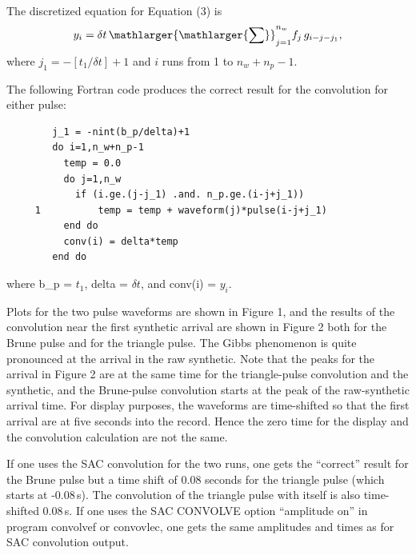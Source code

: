 The discretized equation for Equation (3) is 
\begin{equation}
y_i = \delta t \, \mathlarger{\mathlarger{\sum}}_{j=1}^{n_w}f_{j}\,g_{i-j-j_1}, 
\end{equation}
where $j_1 = -[t_1/\delta t]+1$ and $i$ runs from 1 to $n_w + n_p - 1$.


The following Fortran code produces the correct result for the convolution for either pulse:

\begin{verbatim}
        j_1 = -nint(b_p/delta)+1
        do i=1,n_w+n_p-1
          temp = 0.0
          do j=1,n_w
            if (i.ge.(j-j_1) .and. n_p.ge.(i-j+j_1))
     1          temp = temp + waveform(j)*pulse(i-j+j_1)
          end do
          conv(i) = delta*temp
        end do
\end{verbatim}
where b\_p = $t_1$, delta = $\delta t$, and conv(i) = $y_i$.

Plots for the two pulse waveforms are shown in Figure 1, and the results of the convolution near the first synthetic arrival are shown in Figure 2 both for the Brune pulse and for the triangle pulse. The Gibbs phenomenon is quite pronounced at the arrival in the raw synthetic.  Note that the peaks for the arrival in Figure 2 are at the same time for the triangle-pulse convolution and the synthetic, and the Brune-pulse convolution starts at the peak of the raw-synthetic arrival time. For display purposes, the waveforms are  time-shifted so that the first arrival are at five seconds into the record.  Hence the zero time for the display and the convolution calculation are not the same.

If one uses the SAC convolution for the two runs, one gets the ``correct'' result for the Brune pulse but a time shift of 0.08 seconds for the triangle pulse (which starts at -0.08\,s).  The convolution of the triangle pulse with itself is also time-shifted 0.08\,s.  If one uses the SAC CONVOLVE option ``amplitude on'' in program {\italics convolvef} or {\italics convovlec}, one gets the same amplitudes and times as for SAC convolution output.

